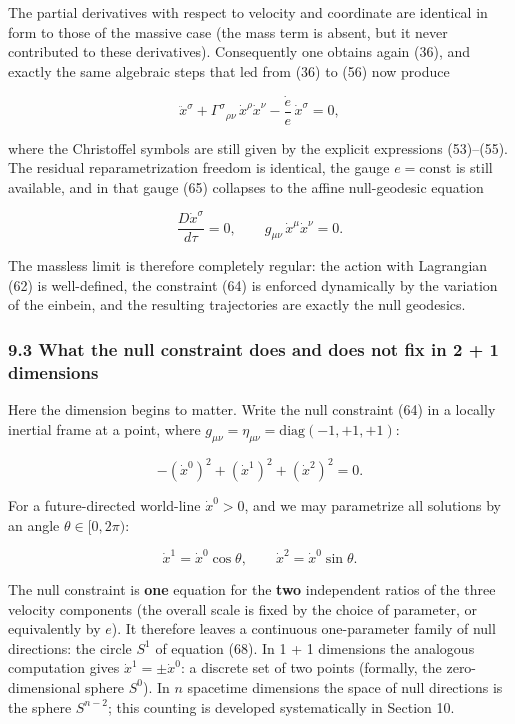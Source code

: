 \documentclass[
]{article}
\begin{document}
The partial derivatives with respect to velocity and coordinate are
identical in form to those of the massive case (the mass term is absent,
but it never contributed to these derivatives). Consequently one obtains
again (36), and exactly the same algebraic steps that led from (36) to
(56) now produce

\[\ddot{x}^{\sigma} + \Gamma^{\sigma}{}_{\rho\nu}\, \dot{x}^{\rho} \dot{x}^{\nu} - \frac{\dot{e}}{e}\, \dot{x}^{\sigma} = 0, \tag{65}\]

where the Christoffel symbols are still given by the explicit
expressions (53)--(55). The residual reparametrization freedom is
identical, the gauge \(e = \mathrm{const}\) is still available, and in
that gauge (65) collapses to the affine null-geodesic equation

\[\frac{D \dot{x}^{\sigma}}{d\tau} = 0, \qquad g_{\mu\nu}\, \dot{x}^{\mu} \dot{x}^{\nu} = 0. \tag{66}\]

The massless limit is therefore completely regular: the action with
Lagrangian (62) is well-defined, the constraint (64) is enforced
dynamically by the variation of the einbein, and the resulting
trajectories are exactly the null geodesics.

\hypertarget{what-the-null-constraint-does-and-does-not-fix-in-2-1-dimensions}{%
\subsubsection{9.3 What the null constraint does and does not fix in 2 +
1
dimensions}\label{what-the-null-constraint-does-and-does-not-fix-in-2-1-dimensions}}

Here the dimension begins to matter. Write the null constraint (64) in a
locally inertial frame at a point, where
\(g_{\mu\nu} = \eta_{\mu\nu} = \mathrm{diag}(-1, +1, +1)\):

\[- \left( \dot{x}^{0} \right)^{2} + \left( \dot{x}^{1} \right)^{2} + \left( \dot{x}^{2} \right)^{2} = 0. \tag{67}\]

For a future-directed world-line \(\dot{x}^{0} > 0\), and we may
parametrize all solutions by an angle \(\theta \in [0, 2\pi)\):

\[\dot{x}^{1} = \dot{x}^{0} \cos\theta, \qquad \dot{x}^{2} = \dot{x}^{0} \sin\theta. \tag{68}\]

The null constraint is \textbf{one} equation for the \textbf{two}
independent ratios of the three velocity components (the overall scale
is fixed by the choice of parameter, or equivalently by \(e\)). It
therefore leaves a continuous one-parameter family of null directions:
the circle \(S^{1}\) of equation (68). In 1 + 1 dimensions the analogous
computation gives \(\dot{x}^{1} = \pm \dot{x}^{0}\): a discrete set of
two points (formally, the zero-dimensional sphere \(S^{0}\)). In \(n\)
spacetime dimensions the space of null directions is the sphere
\(S^{n-2}\); this counting is developed systematically in Section 10.
\end{document}
